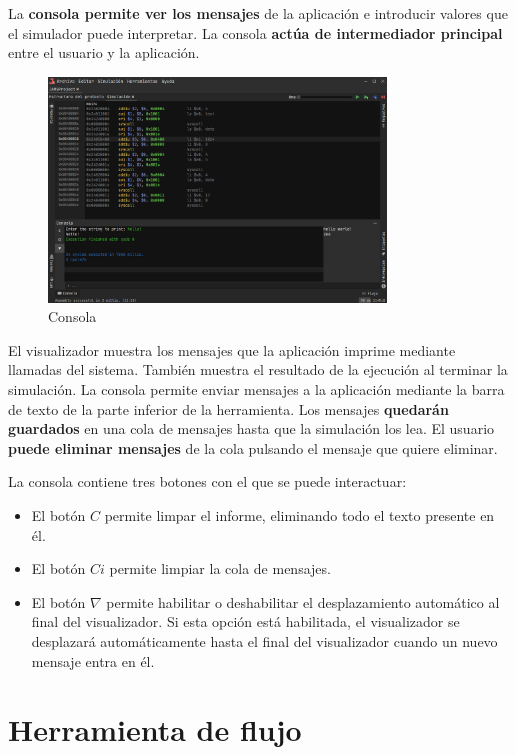 La \textbf{consola permite ver los mensajes} de la aplicación
e introducir valores que el simulador puede interpretar.
La consola \textbf{actúa de intermediador principal}
entre el usuario y la aplicación.

\begin{figure}[H]
    \centering
    \includegraphics[width=0.8\textwidth]{images/tools/jams-console}
    \caption{Consola}
    \label{fig:jams-console}
\end{figure}

El visualizador muestra los mensajes que la aplicación
imprime mediante llamadas del sistema.
También muestra el resultado de la ejecución al terminar la simulación.
La consola permite enviar mensajes a la aplicación mediante la barra de
texto de la parte inferior de la herramienta.
Los mensajes \textbf{quedarán guardados} en una cola de mensajes
hasta que la simulación los lea.
El usuario \textbf{puede eliminar mensajes} de la cola
pulsando el mensaje que quiere eliminar.

La consola contiene tres botones con el que se puede interactuar:
\begin{itemize}
    \item El botón $C$ permite limpar el informe, eliminando todo el
    texto presente en él.
    \item El botón $Ci$ permite limpiar la cola de mensajes.
    \item El botón $\nabla$ permite habilitar o deshabilitar el desplazamiento
    automático al final del visualizador.
    Si esta opción está habilitada, el visualizador se desplazará
    automáticamente hasta el final del visualizador cuando un
    nuevo mensaje entra en él.
\end{itemize}

\section{Herramienta de flujo}\label{sec:herramienta-de-flujo}

